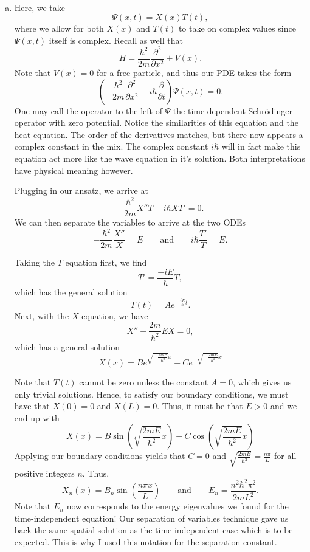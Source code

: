 \documentclass[12pt]{article} %
\begin{document}
\begin{solution}~
\begin{enumerate}[(a)]
    \item Here, we take
    \[
    \Psi(x,t) = X(x)T(t),
    \]
    where we allow for both $X(x)$ and $T(t)$ to take on complex values since $\Psi(x,t)$ itself is complex.  Recall as well that
    \[
    H= \frac{\hbar^2}{2m} \frac{\partial^2}{\partial x^2} + V(x).
    \]
    Note that $V(x)=0$ for a free particle, and thus our PDE takes the form
    \[
    \left(-\frac{\hbar^2}{2m}\frac{\partial^2}{\partial x^2} - i\hbar \frac{\partial}{\partial t} \right) \Psi(x,t)=0.
    \]
    One may call the operator to the left of $\Psi$ the time-dependent Schr\"odinger operator with zero potential. Notice the similarities of this equation and the heat equation. The order of the derivatives matches, but there now appears a complex constant in the mix.  The complex constant $i\hbar$ will in fact make this equation act more like the wave equation in it's solution. Both interpretations have physical meaning however. 
    
    Plugging in our ansatz, we arrive at
    \[
    -\frac{\hbar^2}{2m} X''T - i\hbar XT' = 0.
    \]
    We can then separate the variables to arrive at the two ODEs
    \[
    -\frac{\hbar^2}{2m} \frac{X''}{X} = E \qquad \textrm{and} \qquad i\hbar \frac{T'}{T} = E.
    \]
    
    Taking the $T$ equation first, we find
    \[
    T'=\frac{-iE}{\hbar} T,
    \]
    which has the general solution
    \[
    T(t) = Ae^{-\frac{iE}{\hbar}t}.
    \]
    Next, with the $X$ equation, we have
    \[
    X''+\frac{2m}{\hbar^2}E X = 0,
    \]
    which has a general solution
    \[
    X(x) = Be^{\sqrt{-\frac{2mE}{\hbar^2}}x} + C e^{-\sqrt{-\frac{2mE}{\hbar^2}}x}
    \]
    
    Note that $T(t)$ cannot be zero unless the constant $A=0$, which gives us only trivial solutions.  Hence, to satisfy our boundary conditions, we must have that $X(0)=0$ and $X(L)=0$.  Thus, it must be that $E>0$ and we end up with
    \[
    X(x) = B \sin\left(\sqrt{\frac{2mE}{\hbar^2}}x\right) + C\cos\left(\sqrt{\frac{2mE}{\hbar^2}}x\right)
    \]
    Applying our boundary conditions yields that $C=0$ and $\sqrt{\frac{2mE}{\hbar^2}}=\frac{n\pi}{L}$ for all positive integers $n$. Thus,
    \[
    X_n(x)=B_n \sin\left(\frac{n\pi x}{L}\right) \qquad \textrm{and} \qquad E_n = \frac{n^2\hbar^2 \pi^2}{2mL^2}.
    \]
    Note that $E_n$ now corresponds to the energy eigenvalues we found for the time-independent equation! Our separation of variables technique gave us back the same spatial solution as the time-independent case which is to be expected.  This is why I used this notation for the separation constant.
    

\end{enumerate}
\end{solution}
\end{document}
